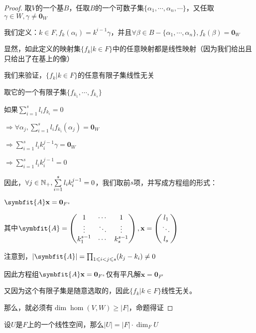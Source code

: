 \documentclass[12pt, a4paper, oneside, UTF8]{ctexbook}
\begin{document}
			\begin{proof}
				取$V$的一个基$B$，任取$B$的一个可数子集$\{\alpha_1,\cdots,\alpha_n,\cdots\}$，又任取$\gamma \in W,\gamma \neq \mathbf{0}_W$

				我们定义：$k \in F,f_k(\alpha_i) = k^{i-1} \gamma$，并且$\forall \beta \in B-\{\alpha_1,\cdots,\alpha_n\},f_k (\beta )=\mathbf{0}_W$

				显然，如此定义的映射集$\{f_k|k \in F\}$中的任意映射都是线性映射（因为我们给出且只给出了在基上的像）

				我们来验证，$\{f_k | k \in F\}$的任意有限子集线性无关

				取它的一个有限子集$\{f_{k_1},\cdots,f_{k_s}\}$

				如果$\sum\limits_{i=1}^{s} l_i f_{k_i} = 0$

				$\Rightarrow \forall \alpha_j,\sum\limits_{i=1}^{s} l_i f_{k_i}(\alpha_j) = \mathbf{0}_W$

				$\Rightarrow \sum\limits_{i=1}^{s} l_i k_i^{j-1} \gamma = \mathbf{0}_W$

				$\Rightarrow \sum\limits_{i=1}^{s} l_i k_i^{j-1} = 0$

				因此，$\forall j \in \mathbb{N}_+,\sum\limits_{i=1}^{s} l_i k_i^{j-1} = 0$，我们取前$s$项，并写成方程组的形式：

				$\symbfit{A}\mathbf{x} = \mathbf{0}_{F^s}$

				其中$\symbfit{A}=\begin{pmatrix}
					1 & \cdots & 1 \\
					\vdots & \ddots & \vdots \\
					k_1^{s-1} & \cdots & k_s^{s-1} \\
				\end{pmatrix},\mathbf{x} = \begin{pmatrix}
					l_1 \\
					\ddots \\
					l_s
				\end{pmatrix}$

				注意到，$|\symbfit{A}|=\prod_{1\leqslant i < j \leqslant s} (k_j - k_i) \neq 0$

				因此方程组$\symbfit{A}\mathbf{x} = 	\mathbf{0}_{F^s}$仅有平凡解$\mathbf{x} = \mathbf{0}_{F^s}$

				又因为这个有限子集是随意选取的，因此$\{f_k|k \in F\}$线性无关。

				那么，就必须有$\dim \hom(V,W) \geqslant |F|$，命题得证
			\end{proof}
			\begin{lemma}{}{}
				设$U$是$F$上的一个线性空间，那么$|U|=|F|\cdot \dim_F U$
			\end{lemma}
\end{document}
